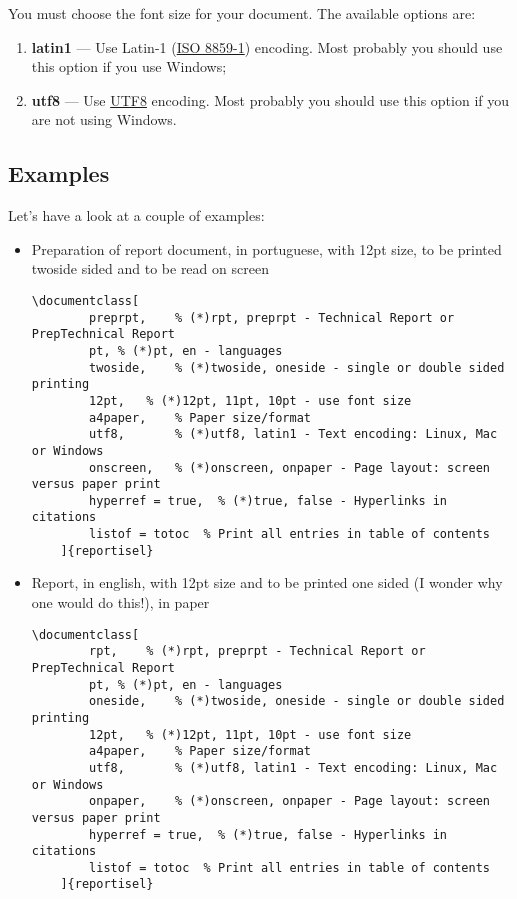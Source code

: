 You must choose the font size for your document. The available options are:
\begin{enumerate}
	\item \textbf{latin1} --- Use Latin-1 (\href{http://en.wikipedia.org/wiki/ISO/IEC_8859-1}{ISO 8859-1}) encoding.  Most probably you should use this option if you use Windows;
	\item \textbf{utf8} --- Use \href{http://en.wikipedia.org/wiki/UTF-8}{UTF8} encoding.    Most probably you should use this option if you are not using Windows.
\end{enumerate}

\subsection{Examples} %
\label{ssec:examples}

Let's have a look at a couple of examples:

\begin{itemize}
	\item Preparation of report document, in portuguese, with 12pt size, to be printed twoside sided  and to be read on screen
	\begin{lstlisting}[language=myLatex]
	\documentclass[
		preprpt,	% (*)rpt, preprpt - Technical Report or PrepTechnical Report
		pt,	% (*)pt, en - languages 
		twoside,	% (*)twoside, oneside - single or double sided printing
		12pt,	% (*)12pt, 11pt, 10pt - use font size
		a4paper,	% Paper size/format
		utf8,		% (*)utf8, latin1 - Text encoding: Linux, Mac or Windows
		onscreen,	% (*)onscreen, onpaper - Page layout: screen versus paper print
		hyperref = true,  % (*)true, false - Hyperlinks in citations
		listof = totoc	% Print all entries in table of contents
	]{reportisel} 
	\end{lstlisting}
	\item Report, in english, with 12pt size and to be printed one sided (I wonder why one would do this!), in paper
	\begin{lstlisting}[language=myLatex]
	\documentclass[
		rpt,	% (*)rpt, preprpt - Technical Report or PrepTechnical Report
		pt,	% (*)pt, en - languages 
		oneside,	% (*)twoside, oneside - single or double sided printing
		12pt,	% (*)12pt, 11pt, 10pt - use font size
		a4paper,	% Paper size/format
		utf8,		% (*)utf8, latin1 - Text encoding: Linux, Mac or Windows
		onpaper,	% (*)onscreen, onpaper - Page layout: screen versus paper print
		hyperref = true,  % (*)true, false - Hyperlinks in citations
		listof = totoc	% Print all entries in table of contents
	]{reportisel} 
	\end{lstlisting}
\end{itemize}

